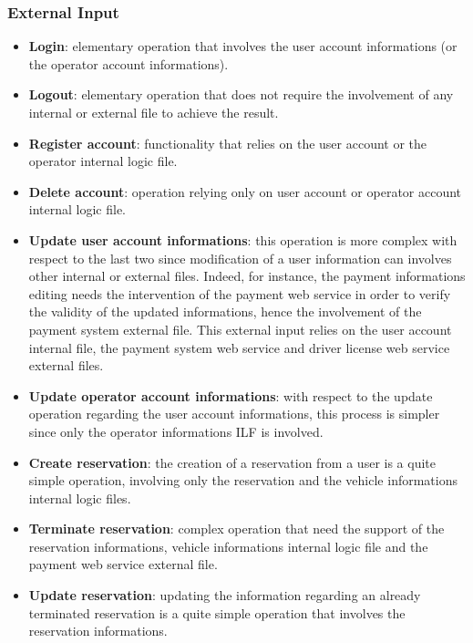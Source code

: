 \subsubsection{External Input}

\begin{itemize}
	\item \textbf{Login}: elementary operation that involves the user account informations (or the operator account informations).

	\item \textbf{Logout}: elementary operation that does not require the involvement of any internal or external file to achieve the result.

	\item \textbf{Register account}: functionality that relies on the user account or the operator internal logic file.

	\item \textbf{Delete account}: operation relying only on user account or operator account internal logic file.

	\item \textbf{Update user account informations}: this operation is more complex with respect to the last two since modification of a user information can involves other internal or external files. Indeed, for instance,
the payment informations editing needs the intervention of the payment web service in order to verify the validity of the updated informations, hence the involvement of the payment system external file.
This external input relies on the user account internal file, the payment system web service and driver license web service external files.

	\item \textbf{Update operator account informations}: with respect to the update operation regarding the user account informations, this process is simpler since only the operator informations ILF is involved.

	\item \textbf{Create reservation}: the creation of a reservation from a user is a quite simple operation, involving only the reservation and the vehicle informations internal logic files.

	\item \textbf{Terminate reservation}: complex operation that need the support of the reservation informations, vehicle informations internal logic file and the payment web service external file.

	\item \textbf{Update reservation}: updating the information regarding an already terminated reservation is a quite simple operation that involves the reservation informations.


\end{itemize}
